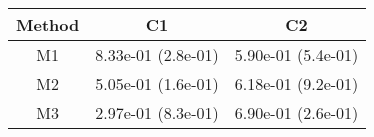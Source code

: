 \begin{tabular}{ccc}
\toprule
Method&C1&C2\tabularnewline
\midrule
M1& 8.33e-01 (2.8e-01)& 5.90e-01 (5.4e-01)\tabularnewline
M2& 5.05e-01 (1.6e-01)& 6.18e-01 (9.2e-01)\tabularnewline
M3& 2.97e-01 (8.3e-01)& 6.90e-01 (2.6e-01)\tabularnewline
\bottomrule
\end{tabular}
